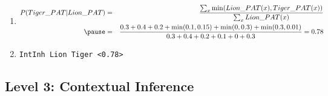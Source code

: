 \documentclass{beamer}
\begin{document}
{\begin{enumerate}
\begin{columns}
  \end{columns}

  \item<+->

    {\tiny
      \begin{eqnarray*}
        P(Tiger\_PAT|Lion\_PAT)
        &
        =
        &
        \frac{\sum_x \min(Lion\_PAT(x), Tiger\_PAT(x))}
        {\sum_x Lion\_PAT(x)}\\
        \pause
        &
        =
        & 
        \frac{0.3+0.4+0.2+\min(0.1,0.15)+\min(0,0.3)+\min(0.3,0.01)}
        {0.3+0.4+0.2+0.1+0+0.3} = 0.78
      \end{eqnarray*}
    }

  \item<+->
      \alert{{\tt IntInh Lion Tiger <0.78>}}
  \end{enumerate}

}

\fi

\subsection{Level 3: Contextual Inference}
\end{document}
